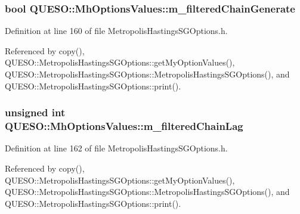 \hypertarget{class_q_u_e_s_o_1_1_mh_options_values_afe02816132a862e807ea3675b4125ccb}{
\subsubsection[{m\-\_\-filtered\-Chain\-Generate}]{\setlength{\rightskip}{0pt plus 5cm}bool Q\-U\-E\-S\-O\-::\-Mh\-Options\-Values\-::m\-\_\-filtered\-Chain\-Generate}}\label{class_q_u_e_s_o_1_1_mh_options_values_afe02816132a862e807ea3675b4125ccb}


Definition at line 160 of file Metropolis\-Hastings\-S\-G\-Options.\-h.



Referenced by copy(), Q\-U\-E\-S\-O\-::\-Metropolis\-Hastings\-S\-G\-Options\-::get\-My\-Option\-Values(), Q\-U\-E\-S\-O\-::\-Metropolis\-Hastings\-S\-G\-Options\-::\-Metropolis\-Hastings\-S\-G\-Options(), and Q\-U\-E\-S\-O\-::\-Metropolis\-Hastings\-S\-G\-Options\-::print().

\hypertarget{class_q_u_e_s_o_1_1_mh_options_values_abd87b32b15f3ce695d910b48d837094f}{
\subsubsection[{m\-\_\-filtered\-Chain\-Lag}]{\setlength{\rightskip}{0pt plus 5cm}unsigned int Q\-U\-E\-S\-O\-::\-Mh\-Options\-Values\-::m\-\_\-filtered\-Chain\-Lag}}\label{class_q_u_e_s_o_1_1_mh_options_values_abd87b32b15f3ce695d910b48d837094f}


Definition at line 162 of file Metropolis\-Hastings\-S\-G\-Options.\-h.



Referenced by copy(), Q\-U\-E\-S\-O\-::\-Metropolis\-Hastings\-S\-G\-Options\-::get\-My\-Option\-Values(), Q\-U\-E\-S\-O\-::\-Metropolis\-Hastings\-S\-G\-Options\-::\-Metropolis\-Hastings\-S\-G\-Options(), and Q\-U\-E\-S\-O\-::\-Metropolis\-Hastings\-S\-G\-Options\-::print().


